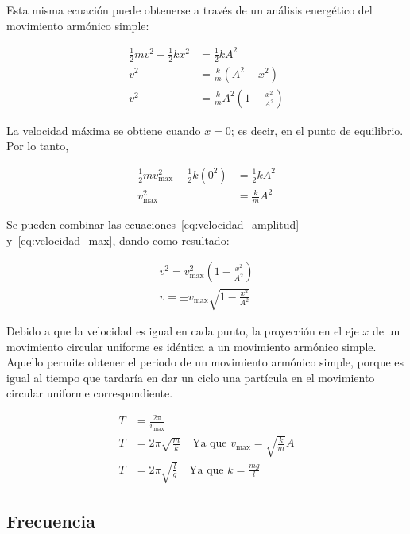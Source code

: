 \documentclass[twocolumn]{report}
\numberwithin{table}{section}
\begin{document}
Esta misma ecuación puede obtenerse a través de un análisis
energético del movimiento armónico simple:

\begin{align}
  \frac{1}{2}mv^{2} + \frac{1}{2}kx^{2} &= \frac{1}{2}kA^{2} \nonumber \\
  v^{2} &= \frac{k}{m}(A^{2} - x^{2}) \nonumber \\
  v^{2} &= \frac{k}{m}A^{2}\left(1 - \frac{x^{2}}{A^{2}}\right)
  \label{eq:velocidad_amplitud}
\end{align}

La velocidad máxima se obtiene cuando $x = 0$; es decir, en el punto de
equilibrio. Por lo tanto,

\begin{align}
  \frac{1}{2}mv_{\max}^{2} + \frac{1}{2}k(0^{2}) &= \frac{1}{2}kA^{2}
  \nonumber \\
  v_{\max}^{2} &= \frac{k}{m}A^{2} \label{eq:velocidad_max}
\end{align}

Se pueden combinar las ecuaciones~\eqref{eq:velocidad_amplitud}
y~\eqref{eq:velocidad_max}, dando como resultado:

\begin{align}
  v^{2} = v^{2}_{\max}\left(1 - \frac{x^{2}}{A^{2}}\right) \nonumber \\
  v = \pm v_{\max}\sqrt{1 - \frac{x^{2}}{A^{2}}}
\end{align}

Debido a que la velocidad es igual en cada punto, la proyección en el
eje $x$ de un movimiento circular uniforme es idéntica a un movimiento armónico
simple. Aquello permite obtener el periodo de un movimiento armónico
simple, porque es igual al tiempo que tardaría en dar un ciclo una
partícula en el movimiento circular uniforme correspondiente.

\begin{align}
  T &= \frac{2\pi}{v_{\max}} \nonumber \\
  T &= 2\pi\sqrt{\frac{m}{k}} \quad \text{Ya que $v_{\max} =
  \sqrt{\frac{k}{m}}A$} \nonumber \\
  T &= 2\pi\sqrt{\frac{l}{g}} \quad \text{Ya que $k =
  \frac{mg}{l}$}\label{eq:mas_periodo}
\end{align}

\subsection{Frecuencia}
\end{document}
